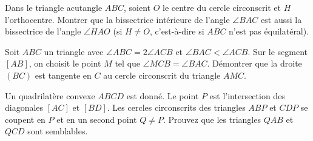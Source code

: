 \begin{problem}
Dans le triangle acutangle $ABC$, soient $O$ le centre du cercle circonscrit et $H$ l'orthocentre. Montrer que la bissectrice intérieure de l'angle $\angle BAC$ est aussi la bissectrice de l'angle $\angle HAO$ (si $H\neq O$, c'est-à-dire si $ABC$ n'est pas équilatéral).
\end{problem}

\begin{problem}
Soit $ABC$ un triangle avec $\angle ABC = 2 \angle ACB$ et $\angle BAC < \angle ACB$. Sur le segment $[AB]$, on choisit le point $M$ tel que $\angle MCB = \angle BAC$. Démontrer que la droite $(BC)$ est tangente en $C$ au cercle circonscrit du triangle $AMC$.
\end{problem}

\begin{problem}
Un quadrilatère convexe $ABCD$ est donné. Le point $P$ est l'intersection des diagonales $[AC]$ et $[BD]$. Les cercles circonscrits des triangles $ABP$ et $CDP$ se coupent en $P$ et en un second point $Q\neq P$. Prouvez que les triangles $QAB$ et $QCD$ sont semblables.
\end{problem}
